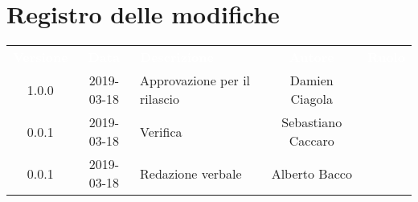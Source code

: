\section*{Registro delle modifiche}
{
	\renewcommand{\arraystretch}{1.5}
	\centering
	\begin{longtable}{ c c  C{4cm}  c  c }
		
		\textcolor{white}{\textbf{Versione}} & \textcolor{white}{\textbf{Data}} & \textcolor{white}{\textbf{Descrizione}} & \textcolor{white}{\textbf{Autore}} & \textcolor{white}{\textbf{Ruolo}}\\
		1.0.0 & 2019-03-18 & Approvazione per il rilascio & Damien Ciagola & \Res{}\\
		0.0.1 & 2019-03-18 & Verifica & Sebastiano Caccaro & \ver{}\\
		0.0.1 & 2019-03-18 & Redazione verbale & Alberto Bacco & \reda{}\\
		
		
	\end{longtable}
	
}